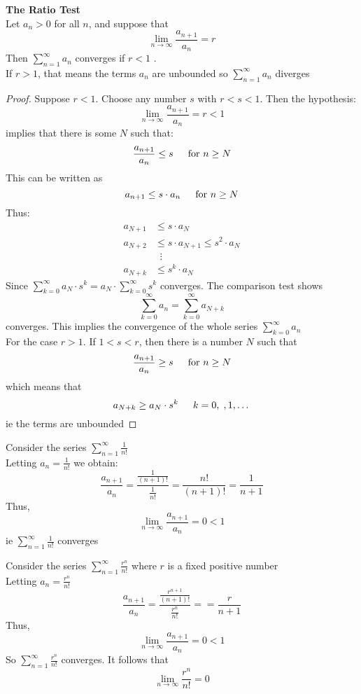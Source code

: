 \begin{theorem}
    \textbf{The Ratio Test} \\
    Let $a_n > 0$ for all $n$, and suppose that 
    $$ \lim _{n \to \infty} \frac{a_{n+1}}{a_n} = r$$
    Then $\sum_{n=1}^\infty a_n$ converges if $r < 1$ .\\
    If $r>1$, that means the terms $a_n$ are unbounded so $\sum_{n=1}^\infty a_n$ diverges
\end{theorem}
\begin{proof}
    Suppose $r<1$. Choose any number $s$ with $r<s<1$. Then the hypothesis:
    $$\lim_{n\to \infty} \frac{a_{n+1}}{a_n} = r < 1$$
    implies that there is some $N$ such that:
    $$\frac{a_{n+1}}{a_n} \leq s \indent \text{for } n \geq N$$
    This can be written as
    $$a_{n+1} \leq s \cdot a_n \indent \text{for } n \geq N$$
    Thus:
    \begin{align*}
        a_{N+1} &\leq s \cdot a_N \\
        a_{N+2} &\leq s \cdot a_{N+1} \leq s^2 \cdot a_N \\
                & \; \; \vdots \\
        a_{N+k} &\leq s^k \cdot a_N
    \end{align*}
    Since $\sum_{k=0}^\infty a_N \cdot s^k = a_N \cdot  \sum_{k=0}^\infty s^k$ converges. The comparison test shows 
    $$\sum_{k=0}^\infty a_n = \sum_{k=0}^\infty a_{N+k}$$
    converges. This implies the convergence of the whole series $\sum_{k=0}^\infty a_n$ \\
    For the case $r>1$. If $1<s<r$, then there is a number $N$ such that 
    $$\frac{a_{n+1}}{a_n} \geq s \indent \text{for } n\geq N$$
    which means that 
    $$a_{N+k} \geq a_N \cdot s^k \indent k = 0,\;, 1, \dots$$
    ie the terms are unbounded
\end{proof} \bigskip

\begin{eg}
    Consider the series $\sum_{n=1}^\infty \frac{1}{n!}$ \\
    Letting $a_n = \frac{1}{n!}$ we obtain:
    $$\frac{a_{n+1}}{a_n} = \frac{\frac{1}{(n+1)!}}{\frac{1}{n!}} = \frac{n!}{(n+1)!} = \frac{1}{n+1}$$
    Thus,
    $$\lim_{n\to \infty} \frac{a_{n+1}}{a_n} = 0 < 1$$
    ie $\sum_{n=1}^\infty \frac{1}{n!}$ converges
\end{eg} \bigskip

\begin{eg}
    Consider the series $\sum_{n=1}^\infty \frac{r^n}{n!}$ where $r$ is a fixed positive number \\
    Letting $a_n = \frac{r^n}{n!}$ 
    $$\frac{a_{n+1}}{a_n} = \frac{\frac{r^{n+1}}{(n+1)!}}{\frac{r^n}{n!}} = = \frac{r}{n+1}$$
    Thus,
    $$\lim_{n\to \infty} \frac{a_{n+1}}{a_n} = 0 < 1$$
    So $\sum_{n=1}^\infty \frac{r^n}{n!}$ converges. It follows that 
    $$\lim_{n\to \infty}\frac{r^n}{n!} = 0$$
\end{eg} \bigskip

